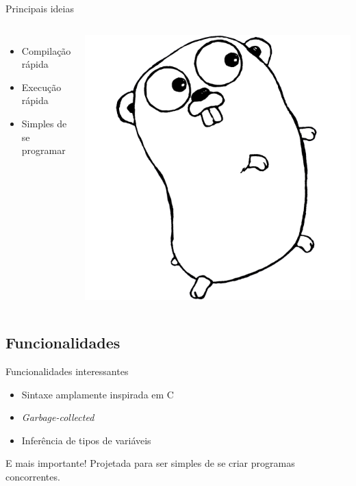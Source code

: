 \documentclass{beamer}
\begin{document}
\begin{frame}
    {Principais ideias}
    \begin{columns}[c]
        \begin{itemize}[<+->]
            \item Compilação rápida
            \item Execução rápida
            \item Simples de se programar
        \end{itemize}

        \centering
        \includegraphics[width=.6\textwidth]{gopherbw.png}
    \end{columns}
\end{frame}

\subsection{Funcionalidades}
\begin{frame}
    {Funcionalidades interessantes}
    \begin{itemize}[<+->]
        \item Sintaxe amplamente inspirada em C
        \item {\em Garbage-collected}
        \item Inferência de tipos de variáveis
    \end{itemize}
\end{frame}

\begin{frame}
    {E mais importante!}
    \pause
    Projetada para ser simples de se criar programas concorrentes.
\end{frame}
\end{document}
